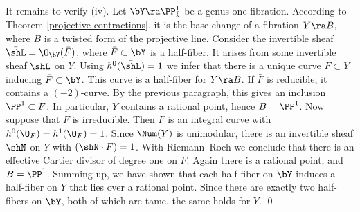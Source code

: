 It remains to verify (iv).
Let $\bY\ra\PP^1_{\bar{k}}$ be a genus-one fibration.
According to Theorem \ref{projective contractions}, it is the base-change of a fibration $Y\ra B$, where $B$ is a twisted form
of the projective line.  Consider the invertible sheaf  $\bar{\shL}=\O_\bY(\bar{F})$, where $\bar{F}\subset\bY$
is a half-fiber. It arises from some invertible sheaf $\shL$ on $Y$.   Using $h^0(\bar{\shL})=1$ we infer that there is a unique curve
$F\subset Y$ inducing $\bar{F}\subset \bY$. This curve is a half-fiber for $Y\ra B$.
If $\bar{F}$ is reducible, it contains a $(-2)$-curve. By the previous paragraph, this gives an inclusion $\PP^1\subset F$.
In particular, $Y$ contains a rational point, hence $B=\PP^1$. Now suppose that $\bar{F}$ is irreducible.
Then $F$ is an integral curve with $h^0(\O_F)=h^1(\O_F)=1$. Since $\Num(Y)$ is unimodular, there
is an invertible sheaf $\shN$ on $Y$ with $(\shN\cdot F)=1$. With Riemann--Roch we conclude that there
is an effective Cartier divisor of degree one on $F$. Again there is a rational point, and $B=\PP^1$.
Summing up, we have shown that each half-fiber on $\bY$ induces a half-fiber on $Y$ that lies over a rational point.
Since there are exactly two half-fibers on $\bY$, both of which are tame, the same holds for $Y$.
\qed

